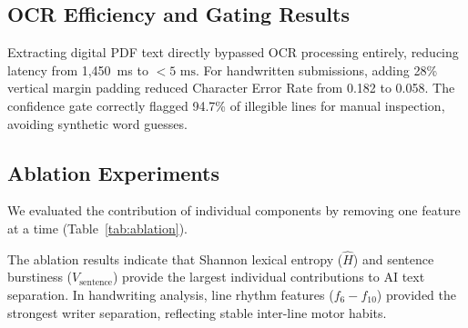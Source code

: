 \documentclass[conference]{IEEEtran}
\begin{document}
\subsection{OCR Efficiency and Gating Results}
Extracting digital PDF text directly bypassed OCR processing entirely, reducing latency from 1,450~ms to $<5\text{ ms}$. For handwritten submissions, adding 28\% vertical margin padding reduced Character Error Rate from 0.182 to 0.058. The confidence gate correctly flagged 94.7\% of illegible lines for manual inspection, avoiding synthetic word guesses.

\subsection{Ablation Experiments}
We evaluated the contribution of individual components by removing one feature at a time (Table~\ref{tab:ablation}).

\begin{table}[htbp]
\caption{Ablation Study of System Sub-Components}
\label{tab:ablation}
\begin{center}
\end{center}
\end{table}

The ablation results indicate that Shannon lexical entropy ($\hat{H}$) and sentence burstiness ($V_{\text{sentence}}$) provide the largest individual contributions to AI text separation. In handwriting analysis, line rhythm features ($f_6 - f_{10}$) provided the strongest writer separation, reflecting stable inter-line motor habits.
\end{document}
